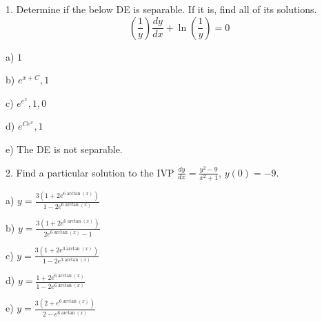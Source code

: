 \documentclass{amsart}
\begin{document}
1. Determine if the below DE is separable. If it is, find all of its solutions. 
\[\left(\frac{1}{y}\right)\frac{dy}{dx}+\ln\left(\frac{1}{y}\right) = 0\]

a) $1$

b) $e^{x+C}, 1$

c) $e^{e^{x}}, 1, 0$ 

d) $e^{Ce^x}, 1$ %

e) The DE is not separable.

2. Find a particular solution to the IVP $\displaystyle \frac{dy}{dx} = \frac{y^2-9}{x^2+1}$, $y(0)=-9$.

a) $\displaystyle y = \frac{3 (1 + 2e^{6\arctan(x)})}{1 - 2e^{6\arctan(x)}}$ %

b) $\displaystyle y = \frac{3 (1 + 2e^{6\arctan(x)})}{2e^{6\arctan(x)}-1}$

c) $\displaystyle y = \frac{3 (1 + 2e^{3\arctan(x)})}{1 - 2e^{3\arctan(x)}}$

d) $\displaystyle y = \frac{1 + 2e^{6\arctan(x)}}{1 - 2e^{6\arctan(x)}}$

e) $\displaystyle y = \frac{3 (2 + e^{6\arctan(x)})}{2 - e^{6\arctan(x)}}$
\end{document}
